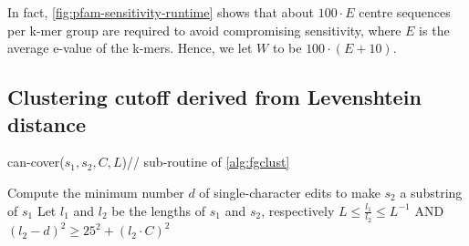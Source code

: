 \documentclass{bioinfo}
\begin{document}
In fact, %
\cref{fig:pfam-sensitivity-runtime}
shows that about \(100\cdot E\) centre sequences per k-mer group are required to avoid compromising sensitivity, where \(E\) is the average e-value of the k-mers. Hence, we let \(W\) to be \(100\cdot(E+10)\). 

\subsection{Clustering cutoff derived from Levenshtein distance}

\label{subsec:editdist}


\begin{algorithm}[t]
	\caption{can-cover(\(s_1, s_2, C, L\))\label{alg:can-cover}\hfill // \scriptsize sub-routine of \cref{alg:fgclust}}
	Compute the minimum number \(d\) of single-character edits to make \(s_2\) a substring of \(s_1\)
	Let \(l_1\) and \(l_2\) be the lengths of \(s_1\) and \(s_2\), respectively\;
	\KwRet \(L \le \frac{l_1}{l_2} \le L^{-1}\)
	AND \((l_2-d)^2 \ge 25^2 + (l_2\cdot C)^2\)\;
\end{algorithm}
\end{document}
